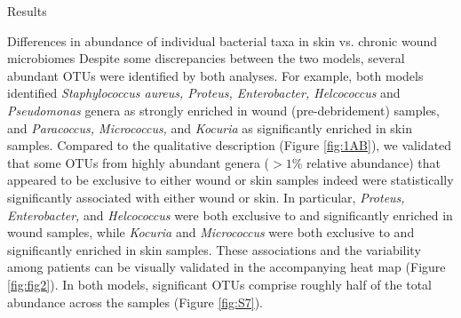\documentclass[oneside,12pt,final]{sty/ucthesis-CA2012}
\begin{document}
\begin{mainmatter}
\begin{section}{Results}
\begin{subsection}{Differences in abundance of individual bacterial taxa in skin vs. chronic wound microbiomes}
Despite some discrepancies between the two models, several abundant OTUs were identified by both analyses. For example, both models identified \textit{Staphylococcus aureus, Proteus, Enterobacter, Helcococcus} and \textit{Pseudomonas} genera as strongly enriched in wound (pre-debridement) samples, and \textit{Paracoccus, Micrococcus,} and \textit{Kocuria} as significantly enriched in skin samples. Compared to the qualitative description (Figure \ref{fig:1AB}), we validated that some OTUs from highly abundant genera ($> 1$\% relative abundance) that appeared to be exclusive to either wound or skin samples indeed were statistically significantly associated with either wound or skin. In particular, \textit{Proteus, Enterobacter,} and \textit{Helcococcus} were both exclusive to and significantly enriched in wound samples, while \textit{Kocuria} and \textit{Micrococcus} were both exclusive to and significantly enriched in skin samples. These associations and the variability among patients can be visually validated in the accompanying heat map (Figure \ref{fig:fig2}). In both models, significant OTUs comprise roughly half of the total abundance across the samples (Figure \ref{fig:S7}). 


\end{subsection}
\end{section}
\end{mainmatter}
\end{document}
